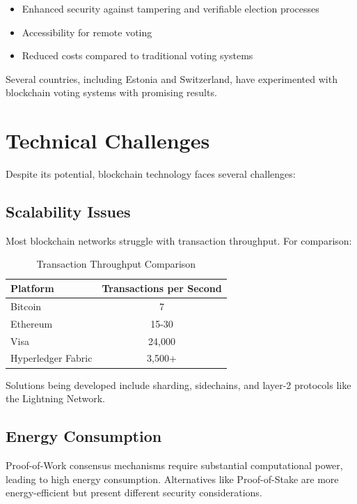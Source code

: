 \documentclass[11pt,a4paper]{article}
\begin{document}
\begin{itemize}
    \item Enhanced security against tampering
    \transparent and verifiable election processes
    \item Accessibility for remote voting
    \item Reduced costs compared to traditional voting systems
\end{itemize}

Several countries, including Estonia and Switzerland, have experimented with blockchain voting systems with promising results.

\section{Technical Challenges}

Despite its potential, blockchain technology faces several challenges:

\subsection{Scalability Issues}
Most blockchain networks struggle with transaction throughput. For comparison:

\begin{table}[h]
\centering
\caption{Transaction Throughput Comparison}
\begin{tabular}{|l|c|}
\hline
\textbf{Platform} & \textbf{Transactions per Second} \\
\hline
Bitcoin & 7 \\
\hline
Ethereum & 15-30 \\
\hline
Visa & 24,000 \\
\hline
Hyperledger Fabric & 3,500+ \\
\hline
\end{tabular}
\label{tab:throughput}
\end{table}

Solutions being developed include sharding, sidechains, and layer-2 protocols like the Lightning Network.

\subsection{Energy Consumption}
Proof-of-Work consensus mechanisms require substantial computational power, leading to high energy consumption. Alternatives like Proof-of-Stake are more energy-efficient but present different security considerations.
\end{document}
